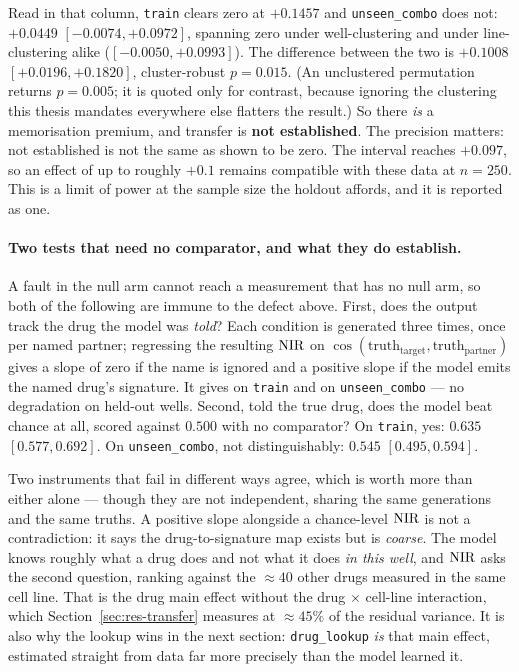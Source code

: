 Read in that column, \texttt{train} clears zero at $+0.1457$ and \texttt{unseen\_combo} does not:
$+0.0449$ \nolinebreak[3]$[-0.0074, +0.0972]$, spanning zero under well-clustering and under
line-clustering alike ($[-0.0050, +0.0993]$). The difference between the two is $+0.1008$
\nolinebreak[3]$[+0.0196, +0.1820]$, cluster-robust $p = 0.015$. (An unclustered permutation returns
$p = 0.005$; it is quoted only for contrast, because ignoring the clustering this thesis mandates
everywhere else flatters the result.) So there \emph{is} a memorisation premium, and transfer is
\textbf{not established}. The precision matters: not established is not the same as shown to be zero.
The interval reaches $+0.097$, so an effect of up to roughly $+0.1$ remains compatible with these
data at $n=250$. This is a limit of power at the sample size the holdout affords, and it is reported
as one.

\paragraph{Two tests that need no comparator, and what they do establish.} A fault in the null arm
cannot reach a measurement that has no null arm, so both of the following are immune to the defect
above. First, does the output track the drug the model was \emph{told}? Each condition is generated
three times, once per named partner; regressing the resulting $\textrm{NIR}$ on
$\cos(\text{truth}_{\text{target}}, \text{truth}_{\text{partner}})$ gives a slope of zero if the name
is ignored and a positive slope if the model emits the named drug's signature. It gives
 on \texttt{train} and  on
\texttt{unseen\_combo} --- no degradation on held-out wells. Second, told the true drug, does the
model beat chance at all, scored against $0.500$ with no comparator? On \texttt{train}, yes:
$0.635$ \nolinebreak[3]$[0.577, 0.692]$. On \texttt{unseen\_combo}, not distinguishably:
$0.545$ \nolinebreak[3]$[0.495, 0.594]$.

Two instruments that fail in different ways agree, which is worth more than either alone --- though
they are not independent, sharing the same generations and the same truths. A positive slope
alongside a chance-level $\textrm{NIR}$ is not a contradiction: it says the drug-to-signature map exists but
is \emph{coarse}. The model knows roughly what a drug does and not what it does \emph{in this well},
and $\textrm{NIR}$ asks the second question, ranking against the $\approx 40$ other drugs measured in the
same cell line. That is the drug main effect without the drug $\times$ cell-line interaction, which
Section~\ref{sec:res-transfer} measures at $\approx 45\%$ of the residual variance. It is also
why the lookup wins in the next section: \texttt{drug\_lookup} \emph{is} that main effect, estimated
straight from data far more precisely than the model learned it.


